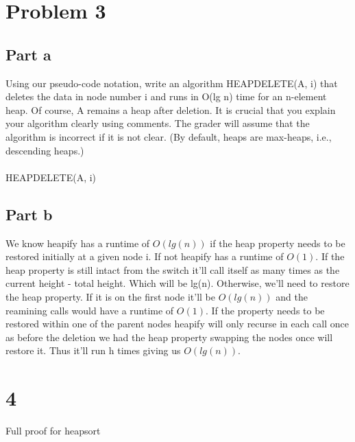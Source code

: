 \documentclass{article}
\begin{document}
\section*{Problem 3}
\subsection*{Part a}

Using our pseudo-code notation, write an algorithm HEAPDELETE(A, i) that
deletes the data in node number i and runs in O(lg n) time for an n-element
heap. Of course, A remains a heap after deletion.
It is crucial that you explain your algorithm clearly using comments. The grader
will assume that the algorithm is incorrect if it is not clear.
(By default, heaps are max-heaps, i.e., descending heaps.)\\\\

HEAPDELETE(A, i)
\begin{algorithmic}[1]
     
     
     
         
         
\end{algorithmic}

\subsection*{Part b}
We know heapify has a runtime of $O(lg(n))$ if the heap property 
needs to be restored initially at a given node i. If not heapify 
has a runtime of $O(1)$. If the heap property is still intact 
from the switch it'll call itself as many times as the current 
height - total height. Which will be lg(n). Otherwise, we'll 
need to restore the heap property. If it is on the first node 
it'll be $O(lg(n))$ and the reamining calls would have a runtime of 
$O(1)$. If the property needs to be restored within one of the parent
nodes heapify will only recurse in each call once as before the deletion 
we had the heap property swapping the nodes once will restore it. Thus 
it'll run h times giving us $O(lg(n))$.\\


\section*{4}
Full proof for heapsort\\\\
\end{document}
